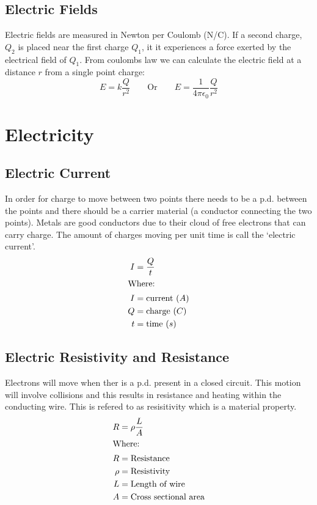 \documentclass[a4paper, 12pt]{article}
\begin{document}
\pagebreak

	\subsection{Electric Fields}
		Electric fields are measured in Newton per Coulomb (N/C). If a second charge, $Q_2$ is placed near the first charge $Q_1$, it it experiences a force exerted by the electrical field of $Q_1$. From coulombs law we can calculate the electric field at a distance $r$ from a single point charge:
		\[ E=k\frac{Q}{r^2} \qquad \text{Or} \qquad E = \frac{1}{4\pi \epsilon _0} \frac{Q}{r^2} \] 
	
	
\newpage

\section{Electricity}
	\subsection{Electric Current}
		In order for charge to move between two points there needs to be a p.d. between the points and there should be a carrier material (a conductor connecting the two points). Metals are good conductors due to their cloud of free electrons that can carry charge. The amount of charges moving per unit time is call the `electric current'.
		\begin{align*}
			I &= \frac{Q}{t} \\
			\intertext{Where: }
			I &= \text{current } (A) \\
			Q &= \text{charge } (C) \\
			t &= \text{time } (s)
		\end{align*} 
		
	\subsection{Electric Resistivity and Resistance}
		Electrons will move when ther is a p.d. present in a closed circuit. This motion will involve collisions and this results in resistance and heating within the conducting wire. This is refered to as resisitivity which is a material property. 
		\begin{align*}	
			R &= \rho \frac{L}{A} \\
			\intertext{Where: }
			R &= \text{Resistance} \\
			\rho &= \text{Resistivity} \\
			L &= \text{Length of wire} \\
			A &= \text{Cross sectional area}  
		\end{align*}
\end{document}
